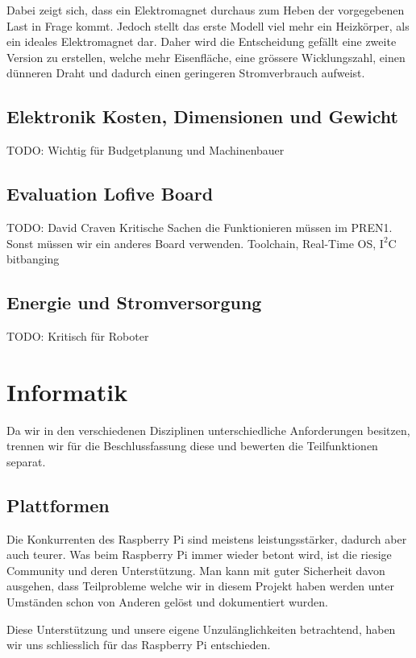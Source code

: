\documentclass[a4paper]{report}
\begin{document}
Dabei zeigt sich, dass ein Elektromagnet durchaus zum Heben der vorgegebenen Last in Frage kommt. Jedoch stellt das erste Modell viel mehr ein Heizkörper, als ein ideales Elektromagnet dar.
Daher wird die Entscheidung gefällt eine zweite Version zu erstellen, welche mehr Eisenfläche, eine grössere Wicklungszahl, einen dünneren Draht und dadurch einen geringeren Stromverbrauch aufweist.

\subsection{Elektronik Kosten, Dimensionen und Gewicht}
TODO: Wichtig für Budgetplanung und Machinenbauer

\subsection{Evaluation Lofive Board}
TODO: David Craven
Kritische Sachen die Funktionieren müssen im PREN1. Sonst müssen wir ein anderes
Board verwenden.
Toolchain, Real-Time OS, $\text{I}^2\text{C}$ bitbanging

\subsection{Energie und Stromversorgung}
TODO: Kritisch für Roboter

\section{Informatik}
Da wir in den verschiedenen Disziplinen unterschiedliche Anforderungen besitzen, trennen wir für die Beschlussfassung diese und bewerten die Teilfunktionen separat.

\subsection{Plattformen}

Die Konkurrenten des Raspberry Pi sind meistens leistungsstärker, dadurch aber auch teurer. Was beim Raspberry Pi immer wieder betont wird, ist die riesige Community und deren Unterstützung. Man kann mit guter Sicherheit davon ausgehen, dass Teilprobleme welche wir in diesem Projekt haben werden unter Umständen schon von Anderen gelöst und dokumentiert wurden.

Diese Unterstützung und unsere eigene Unzulänglichkeiten betrachtend, haben wir uns schliesslich für das Raspberry Pi entschieden.
\end{document}

